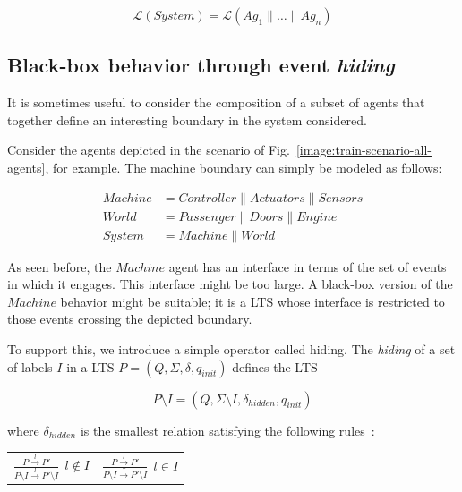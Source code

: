 \begin{equation}
\mathcal{L}(System) = \mathcal{L}(Ag_1 \parallel \ldots \parallel Ag_n)
\label{equation:system-composition}
\end{equation}


\subsection{Black-box behavior through event \emph{hiding}\label{subsection:lts-hiding}}

It is sometimes useful to consider the composition of a subset of agents that together define an interesting boundary in the system considered. 

Consider the agents depicted in the scenario of Fig.~\ref{image:train-scenario-all-agents}, for example. The machine boundary can simply be modeled as follows:

\vspace{-0.8cm}
\begin{align}
Machine &= Controller \parallel Actuators \parallel Sensors \\
World   &= Passenger \parallel Doors \parallel Engine \\
System  &= Machine \parallel World
\end{align}
\vspace{-0.8cm}

As seen before, the $Machine$ agent has an interface in terms of the set of events in which it engages. This interface might be too large. A black-box version of the $Machine$ behavior might be suitable; it is a LTS whose interface is restricted to those events crossing the depicted boundary. 

To support this, we introduce a simple operator called hiding. The \emph{hiding} of a set of labels $I$ in a LTS $P = (Q,\Sigma,\delta,q_{init})$ defines the LTS

\begin{equation}
P \setminus I = (Q,\Sigma \setminus I,\delta_{hidden},q_{init})
\end{equation}

\noindent where $\delta_{hidden}$ is the smallest relation satisfying the following rules~\cite{Giannakopoulou:1999}:

\begin{center}
\begin{tabular}{cc}
$\frac{\displaystyle P \stackrel{l}{\longrightarrow} P'}{\displaystyle P \setminus I \stackrel{l}{\longrightarrow} P' \setminus I}~~l \notin I$ & 
$\frac{\displaystyle P \stackrel{l}{\longrightarrow} P'}{\displaystyle P \setminus I \stackrel{\tau}{\longrightarrow} P' \setminus I}~~l \in I$ \\
\end{tabular}
\end{center}

